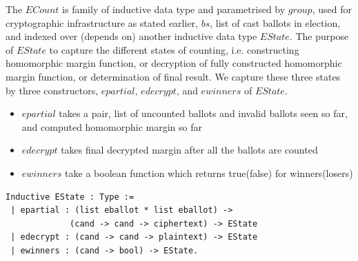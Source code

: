 \documentclass{llncs}
\begin{document}
The $ECount$ is family of inductive data type and 
parametrised by $group$, used for cryptographic 
infrastructure as stated earlier, 
$bs$, list of cast ballots in election, and indexed over (depends on)
 another inductive data type $EState$. 
 The purpose of $EState$ to capture the different states 
of counting, i.e. constructing homomorphic margin 
function, or decryption of fully constructed homomorphic margin function, or 
determination of final result. We capture these three states by 
 three constructors, $epartial$, $edecrypt$, and $ewinners$ of 
 $EState$.

\begin{itemize}
 \item $epartial$ takes a pair, list of uncounted ballots and invalid ballots seen 
       so far, and computed homomorphic margin so far
 \item $edecrypt$ takes final decrypted margin after all the ballots are counted
 \item $ewinners$ take a boolean function which returns true(false) for winners(losers)
\end{itemize}


\begin{verbatim}
Inductive EState : Type :=
 | epartial : (list eballot * list eballot) ->
             (cand -> cand -> ciphertext) -> EState
 | edecrypt : (cand -> cand -> plaintext) -> EState
 | ewinners : (cand -> bool) -> EState.
\end{verbatim}
\end{document}
